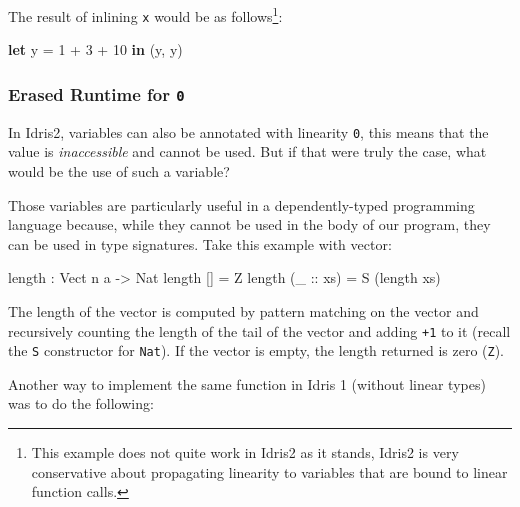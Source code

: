 \documentclass[
]{article}
\newenvironment{Shaded}{}{}
\newcommand{\DataTypeTok}[1]{\textcolor[rgb]{0.56,0.13,0.00}{#1}}
\newcommand{\DecValTok}[1]{\textcolor[rgb]{0.25,0.63,0.44}{#1}}
\newcommand{\FunctionTok}[1]{\textcolor[rgb]{0.02,0.16,0.49}{#1}}
\newcommand{\KeywordTok}[1]{\textcolor[rgb]{0.00,0.44,0.13}{\textbf{#1}}}
\newcommand{\NormalTok}[1]{#1}
\newcommand{\OperatorTok}[1]{\textcolor[rgb]{0.40,0.40,0.40}{#1}}
\newcommand{\OtherTok}[1]{\textcolor[rgb]{0.00,0.44,0.13}{#1}}
\begin{document}
The result of inlining \texttt{x} would be as follows\footnote{This
  example does not quite work in Idris2 as it stands, Idris2 is very
  conservative about propagating linearity to variables that are bound
  to linear function calls.}:

\begin{Shaded}
\begin{Highlighting}[]
\KeywordTok{let}\NormalTok{ y }\OtherTok{=} \DecValTok{1} \OperatorTok{+} \DecValTok{3} \OperatorTok{+} \DecValTok{10} \KeywordTok{in}
\NormalTok{    (y, y)}
\end{Highlighting}
\end{Shaded}

\hypertarget{erased-runtime-for-0}{%
\subsubsection{\texorpdfstring{Erased Runtime for
\texttt{0}}{Erased Runtime for 0}}\label{erased-runtime-for-0}}

In Idris2, variables can also be annotated with linearity \texttt{0},
this means that the value is \emph{inaccessible} and cannot be used. But
if that were truly the case, what would be the use of such a variable?

Those variables are particularly useful in a dependently-typed
programming language because, while they cannot be used in the body of
our program, they can be used in type signatures. Take this example with
vector:

\begin{Shaded}
\begin{Highlighting}[]
\FunctionTok{length} \OperatorTok{:} \DataTypeTok{Vect}\NormalTok{ n a }\OtherTok{{-}\textgreater{}} \DataTypeTok{Nat}
\FunctionTok{length}\NormalTok{ [] }\OtherTok{=} \DataTypeTok{Z}
\FunctionTok{length}\NormalTok{ (}\OtherTok{\_ ::}\NormalTok{ xs) }\OtherTok{=} \DataTypeTok{S}\NormalTok{ (}\FunctionTok{length}\NormalTok{ xs)}
\end{Highlighting}
\end{Shaded}

The length of the vector is computed by pattern matching on the vector
and recursively counting the length of the tail of the vector and adding
\texttt{+1} to it (recall the \texttt{S} constructor for \texttt{Nat}).
If the vector is empty, the length returned is zero (\texttt{Z}).

Another way to implement the same function in Idris 1 (without linear
types) was to do the following:
\end{document}
